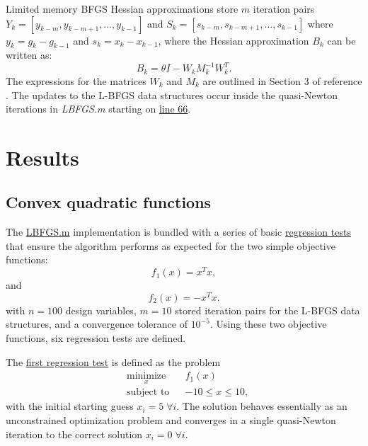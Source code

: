\documentclass[11pt]{article}
\begin{document}
Limited memory BFGS Hessian approximations store $m$ iteration
pairs $Y_k = [y_{k-m}, y_{k-m+1}, \dots, y_{k-1}]$ and
$S_k = [s_{k-m}, s_{k-m+1}, \dots, s_{k-1}]$ where
$y_k = g_k - g_{k-1}$ and $s_k = x_k - x_{k-1}$, where the
Hessian approximation $B_k$ can be written as:
%
\begin{equation}
B_k = \theta I - W_k M^{-1}_k W^T_k.
\end{equation}
%
The expressions for the matrices $W_k$ and $M_k$ are
outlined in Section 3 of reference \cite{lbfgsb}. The updates
to the L-BFGS data structures occur inside the quasi-Newton
iterations in \emph{LBFGS.m} starting on
\href{https://github.com/bgranzow/L-BFGS-B/blob/master/LBFGSB.m#L66}{line 66}.

\section{Results}

\subsection{Convex quadratic functions}

The \href{https://github.com/bgranzow/L-BFGS-B/blob/master/test_LBFGSB.m}
{LBFGS.m} implementation is bundled with a series of basic
\href{https://github.com/bgranzow/L-BFGS-B/blob/master/test_LBFGSB.m}
{regression tests} that ensure the algorithm performs as
expected for the two simple objective functions:
%
\begin{equation}
f_1(x) = x^T x,
\end{equation}
and
\begin{equation}
f_2(x) = - x^T x.
\end{equation}
%
with $n = 100$ design variables, $m=10$ stored iteration
pairs for the L-BFGS data structures, and a convergence
tolerance of $10^{-5}$. Using these two objective
functions, six regression tests are defined.

The
\href{https://github.com/bgranzow/L-BFGS-B/blob/master/test_LBFGSB.m#L10}
{first regression test} is defined as the problem
%
\begin{equation}
\begin{aligned}
& \underset{x}{\text{minimize}}
& & f_1(x) \\
& \text{subject to}
& & -10 \leq x \leq 10,
\end{aligned}
\end{equation}
%
with the initial starting guess $x_i = 5 \; \forall i$.
The solution behaves essentially as an unconstrained
optimization problem and converges in a single quasi-Newton
iteration to the correct solution
$x_i = 0 \; \forall i$.
\end{document}
